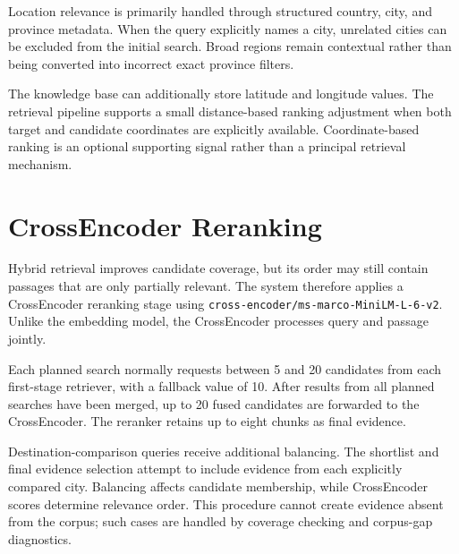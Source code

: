 Location relevance is primarily handled through structured country, city, and
province metadata. When the query explicitly names a city, unrelated cities
can be excluded from the initial search. Broad regions remain contextual rather
than being converted into incorrect exact province filters.

The knowledge base can additionally store latitude and longitude values. The
retrieval pipeline supports a small distance-based ranking adjustment when both
target and candidate coordinates are explicitly available. Coordinate-based
ranking is an optional supporting signal rather than a principal retrieval
mechanism.

\section{CrossEncoder Reranking}

Hybrid retrieval improves candidate coverage, but its order may still contain
passages that are only partially relevant. The system therefore applies a
CrossEncoder reranking stage using
\texttt{cross-encoder/ms-marco-MiniLM-L-6-v2}. Unlike the embedding model, the
CrossEncoder processes query and passage jointly.

Each planned search normally requests between 5 and 20 candidates from each
first-stage retriever, with a fallback value of 10. After results from all
planned searches have been merged, up to 20 fused candidates are forwarded to
the CrossEncoder. The reranker retains up to eight chunks as final evidence.

Destination-comparison queries receive additional balancing. The shortlist and
final evidence selection attempt to include evidence from each explicitly
compared city. Balancing affects candidate membership, while CrossEncoder
scores determine relevance order. This procedure cannot create evidence absent
from the corpus; such cases are handled by coverage checking and corpus-gap
diagnostics.

